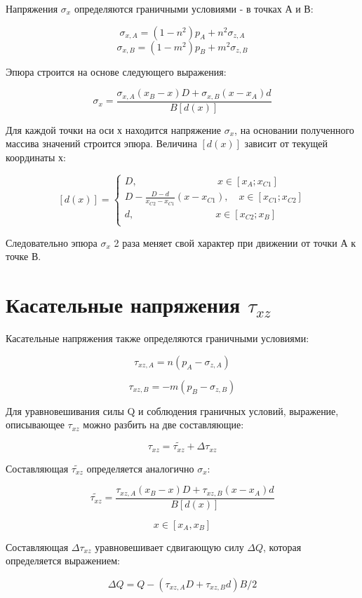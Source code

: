 \documentclass[12pt,a4paper,oneside,draft,titlepage]{article}
\begin{document}
Напряжения $\sigma_x$ определяются граничными условиями - в точках А и В:

$$ \sigma_{x,A} = (1 - n ^ 2)  p_A + n ^ 2  \sigma_{z,A} $$
$$ \sigma_{x,B} = (1 - m ^ 2)  p_B + m ^ 2  \sigma_{z,B} $$

Эпюра строится на основе следующего выражения:

$$ \sigma_x = \frac{\sigma_{x,A} (x_B - x) D + \sigma_{x,B} (x - x_A) d}{B [d(x)]} $$

Для каждой точки на оси х находится напряжение $\sigma_x$, на основании полученного массива значений строится эпюра.
Величина $[d(x)]$ зависит от текущей координаты х:

 $$ [d(x)] =
 \begin{cases}
 D, \qquad \qquad \qquad \qquad \,x \in [x_A; x_{C1}]\\
 D - \frac{D - d}{x_{C2} - x_{C1}} (x - x_{C1}), \quad x \in [x_{C1}; x_{C2}]\\
 d, \qquad \qquad \qquad \qquad \; x \in [x_{C2}; x_B]\\
 \end{cases}
 $$
 
Следовательно эпюра $\sigma_x$ 2 раза меняет свой характер при движении от точки А к точке В.

\section{Касательные напряжения $\tau_{xz}$}

Касательные напряжения также определяются граничными условиями:

$$ \tau_{xz,A} = n (p_A - \sigma_{z,A}) $$
 
$$ \tau_{xz,B} = -m (p_B - \sigma_{z,B}) $$

Для уравновешивания силы Q и соблюдения граничных условий, выражение, описывающее $\tau_{xz}$ можно разбить на две составляющие:

$$ \tau_{xz} = \tilde{\tau_{xz}} + \Delta \tau_{xz} $$

Составляющая $\tilde{\tau_{xz}}$ определяется аналогично $\sigma_x$:

$$ \tilde{\tau_{xz}} = \frac{\tau_{xz,A} (x_B - x) D + \tau_{xz,B} (x - x_A) d }{B [d(x)]} $$
 
$$ x \in [x_A, x_B] $$

Составляющая $\Delta \tau_{xz}$ уравновешивает сдвигающую силу $\Delta Q$, которая определяется выражением:

$$ \Delta Q = Q - (\tau_{xz,A} D + \tau_{xz,B} d) B / 2 $$
\end{document}
